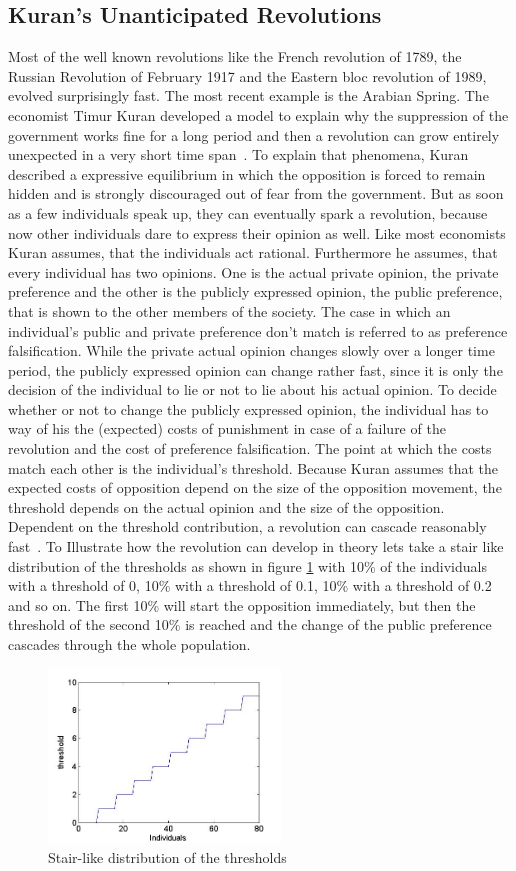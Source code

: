 

\subsection{Kuran's Unanticipated Revolutions} 
\label{sec:Kuran}

Most of the well known revolutions like the French revolution of 1789, the Russian Revolution of February 1917 and the Eastern bloc revolution of 1989, evolved surprisingly fast. The most recent example is the Arabian Spring. The economist Timur Kuran developed a model to explain why the suppression of the government works fine for a long period and then a revolution can grow entirely unexpected in a very short time span~\cite{Kuran_1989}.
To explain that phenomena, Kuran described a expressive equilibrium in which the opposition is forced to remain hidden and is strongly discouraged out of fear from the government. But as soon as a few individuals speak up, they can eventually spark a revolution, because now other individuals dare to express their opinion as well.
Like most economists Kuran assumes, that the individuals act rational. Furthermore he assumes, that every individual has two opinions. One is the actual private opinion, the private preference and the other is the publicly expressed opinion, the public preference, that is shown to the other members of the society. The case in which an individual's public and private preference don't match is referred to as preference falsification. While the private actual opinion changes slowly over a longer time period, the publicly expressed opinion can change rather fast, since it is only the decision of the individual to lie or not to lie about his actual opinion. 
To decide whether or not to change the publicly expressed opinion, the individual has to way of his the (expected) costs of punishment in case of a failure of the revolution and the cost of preference falsification. The point at which the costs match each other is the individual's threshold.  Because Kuran assumes that the expected costs of opposition depend on the size of the opposition movement, the threshold depends on the actual opinion and the size of the opposition. Dependent on the threshold contribution, a revolution can cascade reasonably fast~\cite{Donnay_2011}.
To Illustrate how the revolution can develop in theory lets take a stair like distribution of the thresholds as shown in figure \ref{cascadethreshold} with 10\% of the individuals with a threshold of 0, 10\% with a threshold of 0.1, 10\% with a threshold of 0.2 and so on. The first 10\% will start the opposition immediately, but then the threshold of the second 10\% is reached and the change of the public preference cascades through the whole population.
\begin{figure}[!b]
\centering
\includegraphics[width=0.55\textwidth, keepaspectratio=true]{cascadethresholddistripution.jpg}
\caption{Stair-like distribution of the thresholds}
\label{cascadethreshold}
\end{figure}
